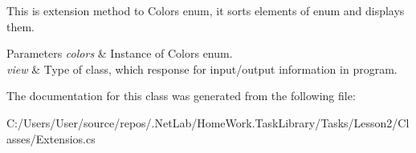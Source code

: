 This is extension method to Colors enum, it sorts elements of enum and displays them. 


\begin{DoxyParams}{Parameters}
{\em colors} & Instance of Colors enum.\\
\hline
{\em view} & Type of class, which response for input/output information in program.\\
\hline
\end{DoxyParams}


The documentation for this class was generated from the following file\+:\begin{DoxyCompactItemize}
\item 
C\+:/\+Users/\+User/source/repos/.\+Net\+Lab/\+Home\+Work.\+Task\+Library/\+Tasks/\+Lesson2/\+Classes/Extensios.\+cs\end{DoxyCompactItemize}
